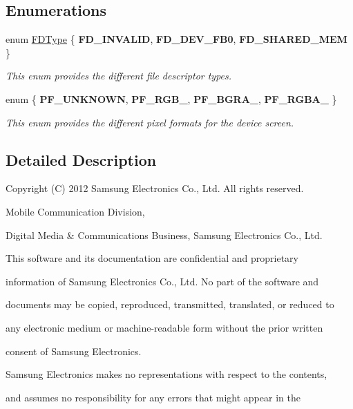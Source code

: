 \subsection*{\-Enumerations}
\begin{DoxyCompactItemize}
\item 
enum \hyperlink{namespaceknoxremotedesktop_a01c73ba2fbebc2395aae6198eb87a416}{\-F\-D\-Type} \{ {\bfseries \-F\-D\-\_\-\-I\-N\-V\-A\-L\-I\-D}, 
{\bfseries \-F\-D\-\_\-\-D\-E\-V\-\_\-\-F\-B0}, 
{\bfseries \-F\-D\-\_\-\-S\-H\-A\-R\-E\-D\-\_\-\-M\-E\-M}
 \}
\begin{DoxyCompactList}\small\item\em \-This enum provides the different file descriptor types. \end{DoxyCompactList}\item 
enum \{ {\bfseries \-P\-F\-\_\-\-U\-N\-K\-N\-O\-W\-N}, 
{\bfseries \-P\-F\-\_\-\-R\-G\-B\-\_}, 
{\bfseries \-P\-F\-\_\-\-B\-G\-R\-A\-\_}, 
{\bfseries \-P\-F\-\_\-\-R\-G\-B\-A\-\_}
 \}
\begin{DoxyCompactList}\small\item\em \-This enum provides the different pixel formats for the device screen. \end{DoxyCompactList}\end{DoxyCompactItemize}


\subsection{\-Detailed \-Description}
\-Copyright (\-C) 2012 \-Samsung \-Electronics \-Co., \-Ltd. \-All rights reserved.

\-Mobile \-Communication \-Division,

\-Digital \-Media \& \-Communications \-Business, \-Samsung \-Electronics \-Co., \-Ltd.

\-This software and its documentation are confidential and proprietary

information of \-Samsung \-Electronics \-Co., \-Ltd. \-No part of the software and

documents may be copied, reproduced, transmitted, translated, or reduced to

any electronic medium or machine-\/readable form without the prior written

consent of \-Samsung \-Electronics.

\-Samsung \-Electronics makes no representations with respect to the contents,

and assumes no responsibility for any errors that might appear in the


